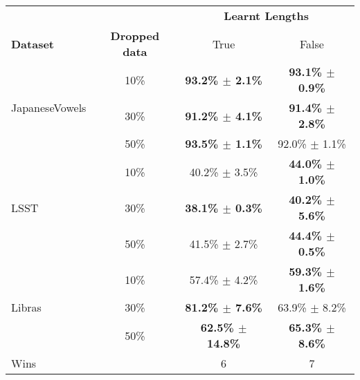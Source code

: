 \begin{tabular}{lccc}
\toprule
& {} & \multicolumn{2}{c}{\textbf{Learnt Lengths}} \\  \cmidrule{3-4}
\textbf{Dataset} & \textbf{Dropped data} &              True &           False \\
\midrule
\multirow{3}{*}{JapaneseVowels} & 10\% & \textbf{93.2\% $\pm$ 2.1\%} & \textbf{93.1\% $\pm$ 0.9\%} \\
                                & 30\% & \textbf{91.2\% $\pm$ 4.1\%} & \textbf{91.4\% $\pm$ 2.8\%} \\
                                & 50\% & \textbf{93.5\% $\pm$ 1.1\%} & 92.0\% $\pm$ 1.1\% \\
\multirow{3}{*}{LSST}           & 10\% & 40.2\% $\pm$ 3.5\% & \textbf{44.0\% $\pm$ 1.0\%} \\
                                & 30\% & \textbf{38.1\% $\pm$ 0.3\%} & \textbf{40.2\% $\pm$ 5.6\%} \\
                                & 50\% & 41.5\% $\pm$ 2.7\% & \textbf{44.4\% $\pm$ 0.5\%} \\
\multirow{3}{*}{Libras}         & 10\% & 57.4\% $\pm$ 4.2\% & \textbf{59.3\% $\pm$ 1.6\%} \\
                                & 30\% & \textbf{81.2\% $\pm$ 7.6\%} & 63.9\% $\pm$ 8.2\% \\
                                & 50\% & \textbf{62.5\% $\pm$ 14.8\%} & \textbf{65.3\% $\pm$ 8.6\%} \\
\midrule
Wins                            &    & 6 & 7 \\
\bottomrule
\end{tabular}



